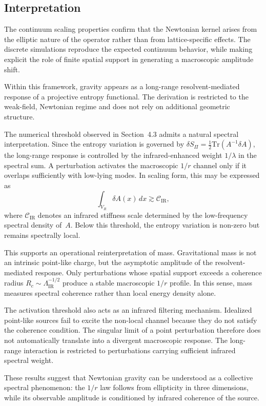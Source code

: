 \subsection{Interpretation}
  \label{subsec:continuum-interpretation}

  The continuum scaling properties confirm that
  the Newtonian kernel arises from the elliptic nature
  of the operator rather than from lattice-specific effects.
  The discrete simulations reproduce the expected continuum behavior,
  while making explicit the role of finite spatial support
  in generating a macroscopic amplitude shift.

  Within this framework, gravity appears as a long-range
  resolvent-mediated response of a projective entropy functional.
  The derivation is restricted to the weak-field,
  Newtonian regime and does not rely on additional geometric structure.

  The numerical threshold observed in Section~4.3 admits
  a natural spectral interpretation.
  Since the entropy variation is governed by
  $\delta S_\Pi = \frac12 \mathrm{Tr}(A^{-1}\delta A)$,
  the long-range response is controlled by the infrared-enhanced
  weight $1/\lambda$ in the spectral sum.
  A perturbation activates the macroscopic $1/r$ channel
  only if it overlaps sufficiently with low-lying modes.
  In scaling form, this may be expressed as
  \begin{equation}
    \int_{V_R} \delta A(x)\,dx \gtrsim \mathcal{C}_{\mathrm{IR}},
  \end{equation}
  where $\mathcal{C}_{\mathrm{IR}}$ denotes an infrared stiffness scale
  determined by the low-frequency spectral density of~$A$.
  Below this threshold, the entropy variation is non-zero
  but remains spectrally local.

  This supports an operational reinterpretation of mass.
  Gravitational mass is not an intrinsic point-like charge,
  but the asymptotic amplitude of the resolvent-mediated response.
  Only perturbations whose spatial support exceeds
  a coherence radius $R_c \sim \Lambda_{\mathrm{IR}}^{-1/2}$
  produce a stable macroscopic $1/r$ profile.
  In this sense, mass measures spectral coherence
  rather than local energy density alone.

  The activation threshold also acts as an infrared filtering mechanism.
  Idealized point-like sources fail to excite the non-local channel
  because they do not satisfy the coherence condition.
  The singular limit of a point perturbation therefore does not
  automatically translate into a divergent macroscopic response.
  The long-range interaction is restricted to perturbations
  carrying sufficient infrared spectral weight.

  These results suggest that Newtonian gravity can be understood
  as a collective spectral phenomenon:
  the $1/r$ law follows from ellipticity in three dimensions,
  while its observable amplitude is conditioned
  by infrared coherence of the source.
